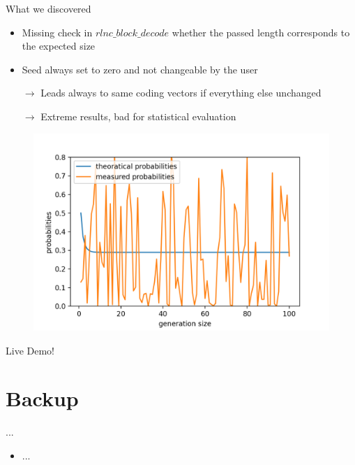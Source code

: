 \documentclass[t]{beamer} %
\begin{document}
\begin{frame}{What we discovered}
	\begin{itemize}
		\item Missing check in \texttt{$rlnc\_block\_decode$} whether the passed length corresponds to the expected size
		\item Seed always set to zero and not changeable by the user
		\item[$\rightarrow$] Leads always to same coding vectors if everything else unchanged
		\item[$\rightarrow$] Extreme results, bad for statistical evaluation
	\end{itemize}
	\begin{figure}[htb]
		\centering
		\includegraphics[scale=0.45]{figures/gf2_noseed}
	\end{figure}
\end{frame}




\begin{frame}[standout]
	Live Demo!
\end{frame}


\appendix
{}
\section{Backup}
\begin{frame}{...}
	\begin{itemize}
		\item ...
	\end{itemize}
\end{frame}
\end{document}
